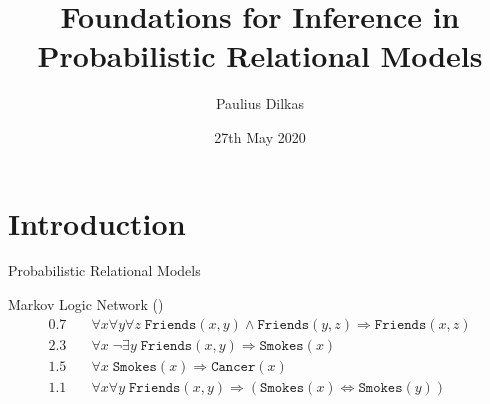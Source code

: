 \documentclass{beamer}
\author{Paulius Dilkas}
\title{Foundations for Inference in Probabilistic Relational Models}
\date{27th May 2020}
\begin{document}
\maketitle
{}

\section{Introduction}

\begin{frame}{Probabilistic Relational Models}
  \begin{block}{Markov Logic Network (\cite{DBLP:journals/ml/RichardsonD06})}
    \vspace*{-\baselineskip}\setlength\belowdisplayshortskip{0pt}
    \begin{align*}
      0.7 &\quad \forall x \forall y \forall z \; \mathtt{Friends}(x, y) \land \mathtt{Friends}(y, z) \Rightarrow \mathtt{Friends}(x, z) \\
      2.3 &\quad \forall x \; \lnot\exists y \; \mathtt{Friends}(x, y) \Rightarrow \mathtt{Smokes}(x) \\
      1.5 &\quad \forall x \; \mathtt{Smokes}(x) \Rightarrow \mathtt{Cancer}(x) \\
      1.1 &\quad \forall x \forall y \; \mathtt{Friends}(x, y) \Rightarrow (\mathtt{Smokes}(x) \Leftrightarrow \mathtt{Smokes}(y))
    \end{align*}
  \end{block}
\end{frame}
\end{document}
